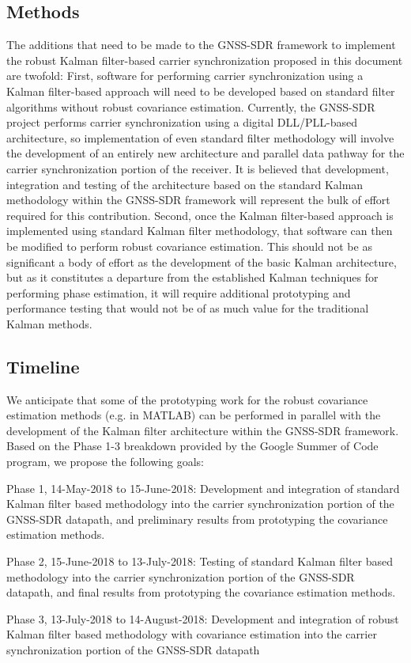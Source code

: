 \subsection{Methods}

The additions that need to be made to the GNSS-SDR framework to implement the robust Kalman filter-based carrier synchronization proposed in this document are twofold: First, software for performing carrier synchronization using a Kalman filter-based approach will need to be developed based on standard filter algorithms without robust covariance estimation. Currently, the GNSS-SDR project performs carrier synchronization using a digital DLL/PLL-based architecture, so implementation of even standard filter methodology will involve the development of an entirely new architecture and parallel data pathway for the carrier synchronization portion of the receiver. It is believed that development, integration and testing of the architecture based on the standard Kalman methodology within the GNSS-SDR framework will represent the bulk of effort required for this contribution. Second, once the Kalman filter-based approach is implemented using standard Kalman filter methodology, that software can then be modified to perform robust covariance estimation. This should not be as significant a body of effort as the development of the basic Kalman architecture, but as it constitutes a departure from the established Kalman techniques for performing phase estimation, it will require additional prototyping and performance testing that would not be of as much value for the traditional Kalman methods.

\subsection{Timeline}

We anticipate that some of the prototyping work for the robust covariance estimation methods (e.g. in MATLAB) can be performed in parallel with the development of the Kalman filter architecture within the GNSS-SDR framework. Based on the Phase 1-3 breakdown provided by the Google Summer of Code program, we propose the following goals:

Phase 1, 14-May-2018 to 15-June-2018: Development and integration of standard Kalman filter based methodology into the carrier synchronization portion of the GNSS-SDR datapath, and preliminary results from prototyping the covariance estimation methods.

Phase 2, 15-June-2018 to 13-July-2018: Testing of standard Kalman filter based methodology into the carrier synchronization portion of the GNSS-SDR datapath, and final results from prototyping the covariance estimation methods.

Phase 3, 13-July-2018 to 14-August-2018: Development and integration of robust Kalman filter based methodology with covariance estimation into the carrier synchronization portion of the GNSS-SDR datapath